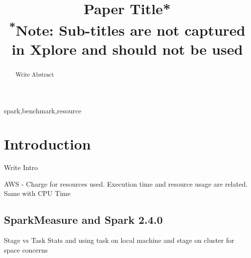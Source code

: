 \documentclass[conference]{IEEEtran}
\begin{document}
\title{Paper Title*\\
{\footnotesize \textsuperscript{*}Note: Sub-titles are not captured in Xplore and
should not be used}
}

\author{
\and
{}
\and
{}
}

\maketitle

\begin{abstract}
Write Abstract
\end{abstract}

\begin{IEEEkeywords}
spark,benchmark,resource
\end{IEEEkeywords}

\section{Introduction}
Write Intro

AWS - Charge for resources used.  Execution time and resource usage are related.  Same with CPU Time


\subsection{SparkMeasure and Spark 2.4.0}

Stage vs Task Stats and using task on local machine and stage on cluster for space concerns
\end{document}

